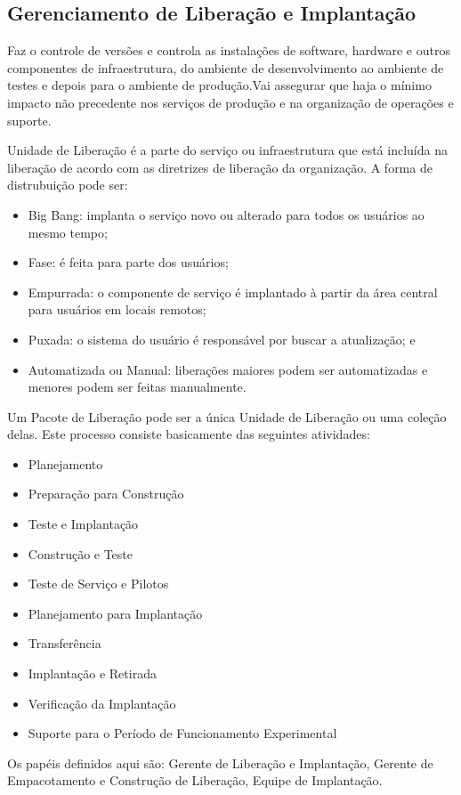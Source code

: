 \subsection{Gerenciamento de Liberação e Implantação}
Faz o controle de versões e controla as instalações de software, hardware e
outros componentes de infraestrutura, do ambiente de desenvolvimento ao
ambiente de testes e depois para o ambiente de produção.Vai assegurar que haja
o mínimo impacto não precedente nos serviços de produção e na organização de
operações e suporte.

Unidade de Liberação é a parte do serviço ou infraestrutura que está incluída
na liberação de acordo com as diretrizes de liberação da organização. A forma
de distrubuição pode ser:
\begin{itemize}
    \item Big Bang: implanta o serviço novo ou alterado para todos os usuários
        ao mesmo tempo;
	\item Fase: é feita para parte dos usuários;
    \item Empurrada: o componente de serviço é implantado à partir da área
        central para usuários em locais remotos;
	\item Puxada: o sistema do usuário é responsável por buscar a atualização; e
    \item Automatizada ou Manual: liberações maiores podem ser automatizadas e
        menores podem ser feitas manualmente.
\end{itemize}

Um Pacote de Liberação pode ser a única Unidade de Liberação ou uma coleção
delas. Este processo consiste basicamente das seguintes atividades:
\begin{itemize}
	\item Planejamento
	\item Preparação para Construção
	\item Teste e Implantação
	\item Construção e Teste
	\item Teste de Serviço e Pilotos
	\item Planejamento para Implantação
	\item Transferência
	\item Implantação e Retirada
	\item Verificação da Implantação
	\item Suporte para o Período de Funcionamento Experimental
\end{itemize}

Os papéis definidos aqui são: Gerente de Liberação e Implantação, Gerente de
Empacotamento e Construção de Liberação, Equipe de Implantação.

